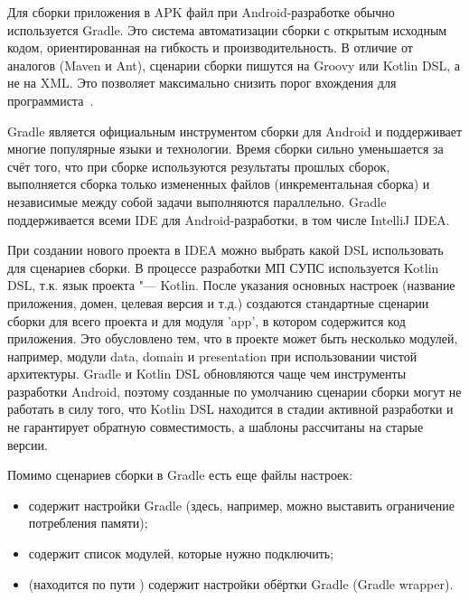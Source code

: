 Для сборки приложения в APK файл при Android-разработке обычно используется Gradle.
Это система автоматизации сборки с открытым исходным кодом, ориентированная на гибкость и производительность.
В отличие от аналогов (Maven и Ant), сценарии сборки пишутся на Groovy или Kotlin DSL, а не на XML\@.
Это позволяет максимально снизить порог вхождения для программиста~\cite{gradle:docs}.

Gradle является официальным инструментом сборки для Android и поддерживает многие популярные языки и технологии.
Время сборки сильно уменьшается за счёт того, что при сборке используются результаты прошлых сборок, выполняется сборка только измененных файлов (инкрементальная сборка) и независимые между собой задачи выполняются параллельно.
Gradle поддерживается всеми IDE для Android-разработки, в том числе IntelliJ IDEA\@.

При создании нового проекта в IDEA можно выбрать какой DSL использовать для сценариев сборки.
В процессе разработки МП СУПС используется Kotlin DSL, т.к. язык проекта "--- Kotlin.
После указания основных настроек (название приложения, домен, целевая версия и т.д.) создаются стандартные сценарии сборки для всего проекта и для модуля 'app', в котором содержится код приложения.
Это обусловлено тем, что в проекте может быть несколько модулей, например, модули data, domain и presentation при использовании чистой архитектуры.
Gradle и Kotlin DSL обновляются чаще чем инструменты разработки Android, поэтому созданные по умолчанию сценарии сборки могут не работать в силу того, что Kotlin DSL находится в стадии активной разработки и не гарантирует обратную совместимость, а шаблоны рассчитаны на старые версии.

Помимо сценариев сборки в Gradle есть еще файлы настроек:
\begin{itemize}
  \item {} содержит настройки Gradle (здесь, например, можно выставить ограничение потребления памяти);
  \item {} содержит список модулей, которые нужно подключить;
  \item {} (находится по пути ) содержит настройки обёртки Gradle (Gradle wrapper).
\end{itemize}

